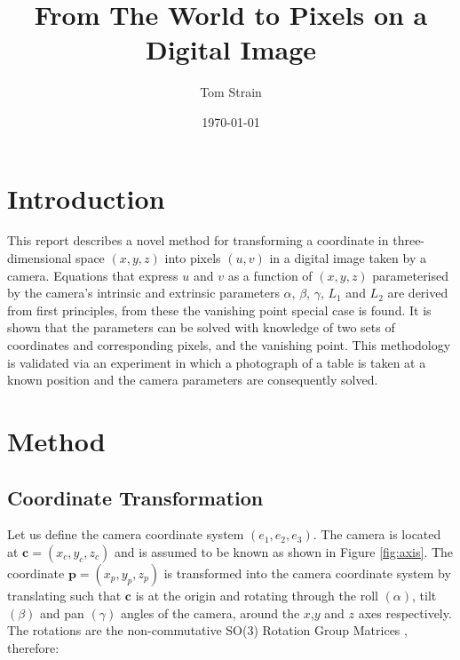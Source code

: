 \documentclass[12pt]{article}
\title{From The World to Pixels on a Digital Image}
\date{\today}
\author{Tom Strain}
\begin{document}
\maketitle


\section{Introduction}
This report describes a novel method for transforming a coordinate in three-dimensional space $(x,y,z)$ into pixels $ (u,v)$ in a digital image taken by a camera. Equations that express $u$ and $v$ as a function of $(x,y,z)$ parameterised by the camera's intrinsic and extrinsic parameters $\alpha$, $\beta$, $\gamma$, $L_1$ and $L_2$ are derived from first principles, from these the vanishing point special case is found. It is shown that the parameters can be solved with knowledge of two sets of coordinates and corresponding pixels, and the vanishing point. This methodology is validated via an experiment in which a photograph of a table is taken at a known position and the camera parameters are consequently solved.


\section{Method}


\subsection{Coordinate Transformation} 
Let us define the camera coordinate system $ (e_1,e_2,e_3)$. The camera is located at $\textbf{c} = (x_c,y_c,z_c)$ and is assumed to be known as shown in Figure \ref{fig:axis}. The coordinate $\textbf{p} = (x_p,y_p,z_p)$ is transformed into the camera coordinate system by translating such that $\textbf{c}$ is at the origin and rotating through the roll $(\alpha)$, tilt $(\beta)$ and pan $(\gamma)$ angles of the camera, around the $x$,$y$ and $z$ axes respectively. The rotations are the non-commutative SO(3) Rotation Group Matrices \cite{rotations}, therefore:
\end{document}
